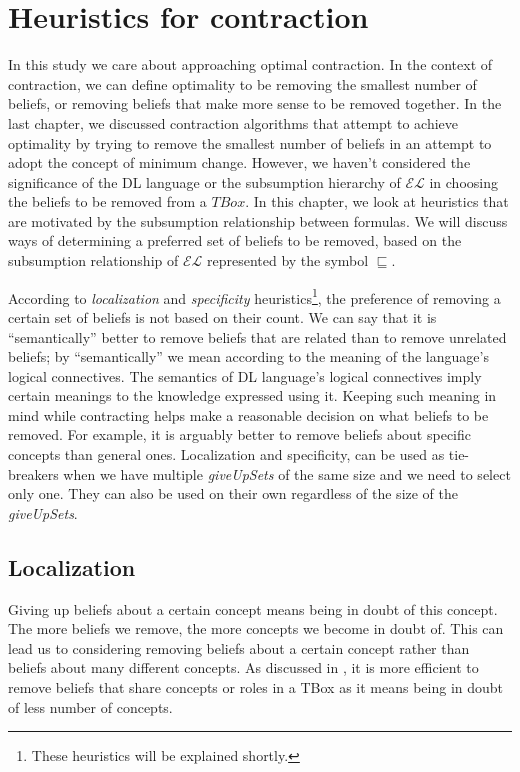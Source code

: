 \chapter{Heuristics for contraction}
\label{heuristics}
In this study we care about approaching optimal contraction. In the context of contraction, we can define optimality to be removing the smallest number of beliefs, or removing beliefs that make more sense to be removed together. In the last chapter, we discussed contraction algorithms that attempt to achieve optimality by trying to remove the smallest number of beliefs in an attempt to adopt the concept of minimum change. However, we haven't considered the significance of the DL language or the subsumption hierarchy of $\mathcal{EL}$ in choosing the beliefs to be removed from a $TBox$. In this chapter, we look at heuristics that are motivated by the subsumption relationship between formulas. We will discuss ways of determining a preferred set of beliefs to be removed, based on the subsumption relationship of $\mathcal{EL}$ represented by the symbol $\sqsubseteq$. 

According to \textit{localization} and \textit{specificity} heuristics\footnote{These heuristics will be explained shortly.}, the preference of removing a certain set of beliefs is not based on their count. We can say that it is ``semantically'' better to remove beliefs that are related than to remove unrelated beliefs; by ``semantically'' we mean according to the meaning of the language's logical connectives. The semantics of DL language's logical connectives imply certain meanings to the knowledge expressed using it. Keeping such meaning in mind while contracting helps make a reasonable decision on what beliefs to be removed. For example, it is arguably better to remove beliefs about specific concepts than general ones. Localization and specificity, can be used as tie-breakers when we have multiple \textit{giveUpSets} of the same size and we need to select only one. They can also be used on their own regardless of the size of the \textit{giveUpSets}.

\section{Localization}
Giving up beliefs about a certain concept means being in doubt of this concept. The more beliefs we remove, the more concepts we become in doubt of. This can lead us to considering removing beliefs about a certain concept rather than beliefs about many different concepts. As discussed in \cite{zwei}, it is more efficient to remove beliefs that share concepts or roles in a TBox as it means being in doubt of less number of concepts.

